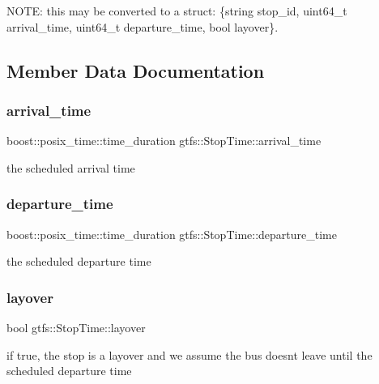 N\+O\+TE\+: this may be converted to a struct\+: \{string stop\+\_\+id, uint64\+\_\+t arrival\+\_\+time, uint64\+\_\+t departure\+\_\+time, bool layover\}. 

\subsection{Member Data Documentation}
\mbox{\label{structgtfs_1_1StopTime_a994ec898edd96675200f759acd76a57c}} 
\subsubsection{\texorpdfstring{arrival\+\_\+time}{arrival\_time}}
{\footnotesize\ttfamily boost\+::posix\+\_\+time\+::time\+\_\+duration gtfs\+::\+Stop\+Time\+::arrival\+\_\+time}

the scheduled arrival time \mbox{\label{structgtfs_1_1StopTime_ad11c398eca36ff99f0934883141de3c9}} 
\subsubsection{\texorpdfstring{departure\+\_\+time}{departure\_time}}
{\footnotesize\ttfamily boost\+::posix\+\_\+time\+::time\+\_\+duration gtfs\+::\+Stop\+Time\+::departure\+\_\+time}

the scheduled departure time \mbox{\label{structgtfs_1_1StopTime_af8cc780329a837a49a5d6af60b74b9bf}} 
\subsubsection{\texorpdfstring{layover}{layover}}
{\footnotesize\ttfamily bool gtfs\+::\+Stop\+Time\+::layover}

if true, the stop is a layover and we assume the bus doesn\textquotesingle{}t leave until the scheduled departure time \mbox{\label{structgtfs_1_1StopTime_a258bc40f919b9d804797d7d75f0c0eca}} 
